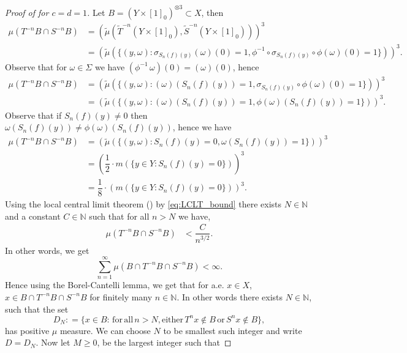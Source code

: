 \documentclass[12pt,reqno]{amsart}
\newcommand{\N}{\mathbb{N}}
\newcommand{\TT}{\widetilde{T}}
\newcommand{\TS}{\widetilde{S}}
\newcommand{\Tmu}{\widetilde{\mu}}
\theoremstyle{definition}
\begin{document}
\begin{proof}[Proof of  for $c=d=1$] Let $B = (Y \times [1]_{0})^{\otimes3} \subset X$, then
\begin{align*}
    \mu(T^{-n}B \cap S^{-n}B) &= \left(\Tmu \left(\TT^{-n}(Y \times [1]_{0}), \TS^{-n}(Y \times [1]_{0})\right)\right)^3\\
    &= \left(\Tmu\left(\{(y,\omega) : \sigma_{S_n(f)(y)} (\omega)(0) = 1, \phi^{-1}\circ\sigma_{S_n(f)(y)} \circ \phi(\omega) (0) =1 \}\right)\right)^3.
\end{align*} 
Observe that for $\omega \in \Sigma$ we have $(\phi^{-1}\, \omega) (0) = (\omega) (0)$, hence
\begin{align*}
    \mu(T^{-n}B \cap S^{-n}B) &= \left(\Tmu\left(\{(y,\omega) : (\omega)(S_n(f)(y)) = 1, \sigma_{S_n(f)(y)} \circ \phi(\omega) (0) =1\}\right)\right)^3\\
    &= \left(\Tmu\left(\{(y,\omega) : (\omega)(S_n(f)(y)) = 1,  \phi(\omega) (S_n(f)(y)) =1\}\right)\right)^3.
\end{align*} 
Observe that if $S_n(f)(y) \neq 0$ then $\omega(S_n(f)(y)) \neq \phi(\omega) (S_n(f)(y))$, hence we have
\begin{align*}
    \mu(T^{-n}B \cap S^{-n}B) &= \left(\Tmu\left(\{(y,\omega) : S_n(f)(y)= 0, \omega(S_n(f)(y)) =1\}\right)\right)^3\\
    &= \left( \dfrac{1}{2}\cdot m\left(\{y\in Y : S_n(f)(y) = 0\}\right)  \right)^3\\
    &= \dfrac{1}{8} \cdot \left(m\left(\{y\in Y : S_n(f)(y) = 0\}\right)\right)^3.
\end{align*} 
Using the local central limit theorem () by \eqref{eq:LCLT_bound} there exists $N \in \N$ and a constant $C \in \N$ such that for all $n > N$ we have,
\begin{align*}
    \mu(T^{-n}B \cap S^{-n}B) &< \dfrac{C}{n^{3/2}}.
\end{align*} In other words, we get
\[
\sum_{n=1}^{\infty} \mu(B \cap T^{-n}B \cap S^{-n}B) < \infty.
\]
Hence using the Borel-Cantelli lemma, we get that for a.e. $x\in X$, $x \in B \cap T^{-n}B \cap S^{-n}B$ for finitely many $n \in \N$. In other words there exists $N \in \N$, such that the set  
\begin{equation}\label{eq:Def_D}
    D_N : = \{x \in B : \,\mathrm{for}\,\mathrm{all}\, n >N,\mathrm{either}\, T^n x \notin B \,\mathrm{or}\, S^n x \notin B \},
\end{equation} has positive $\mu$ measure.  We can choose $N$ to be smallest such integer and write $D=D_N$. Now let $ M\geq 0$, be the largest integer such that %

\end{proof}
\end{document}
